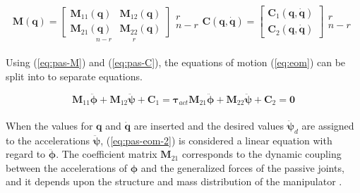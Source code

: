 \begin{subequations}
\begin{equation}\label{eq:pas-M}
    \mathbf{M(q)} =
    \underset{n-r\quad\quad\quad r}{\begin{bmatrix}
        \mathbf{M}_{11}(\mathbf{q}) & \mathbf{M}_{12}(\mathbf{q})\\
        \mathbf{M}_{21}(\mathbf{q}) & \mathbf{M}_{22}(\mathbf{q})
    \end{bmatrix}}
    \begin{matrix}
        r\\n-r
    \end{matrix}
\end{equation}
\begin{equation}\label{eq:pas-C}
    \mathbf{C(q,\dot{q})} =
    \begin{bmatrix}
        \mathbf{C}_1(\mathbf{q,\dot{q}})\\
        \mathbf{C}_2(\mathbf{q,\dot{q}})
    \end{bmatrix}
    \begin{matrix}
        r\\n-r
    \end{matrix}
\end{equation}
\end{subequations}
\\
Using (\ref{eq:pas-M}) and (\ref{eq:pas-C}), the equations of motion (\ref{eq:eom}) can be split into to separate equations.

\begin{subequations}
\begin{equation}\label{eq:pas-eom-1}
    \mathbf{M}_{11} \ddot{\boldsymbol{\phi}} + \mathbf{M}_{12} \ddot{\boldsymbol{\psi}} + \mathbf{C}_1 = \boldsymbol{\tau}_{act}
\end{equation}
\begin{equation}\label{eq:pas-eom-2}
    \mathbf{M}_{21} \ddot{\boldsymbol{\phi}} + \mathbf{M}_{22} \ddot{\boldsymbol{\psi}} + \mathbf{C}_2 = \mathbf{0}
\end{equation}
\end{subequations}
\\
When the values for $\mathbf{q}$ and $\dot{\mathbf{q}}$ are inserted and the desired values $\ddot{\boldsymbol{\psi}}_d$ are assigned to the accelerations $\ddot{\boldsymbol{\psi}}$, (\ref{eq:pas-eom-2}) is considered a linear equation with regard to $\ddot{\boldsymbol{\phi}}$. The coefficient matrix $\mathbf{M}_{21}$ corresponds to the dynamic coupling between the accelerations of $\boldsymbol{\phi}$ and the generalized forces of the passive joints, and it depends upon the structure and mass distribution of the manipulator \cite{arai1991position}.

